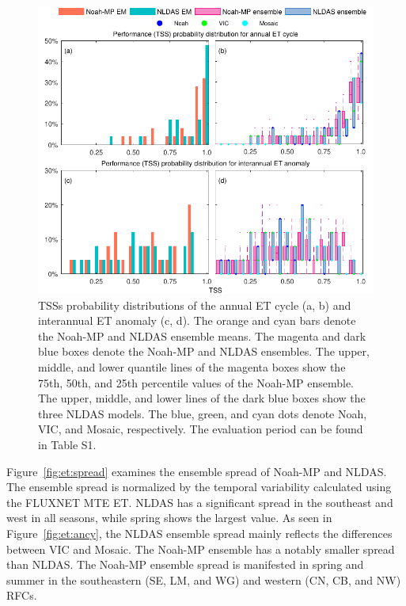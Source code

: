 \documentclass[essd, manuscript]{copernicus}
\begin{document}
\begin{figure}[t]
  \includegraphics[width=12cm]{fig/fig12.pdf}
  \caption{TSSs probability distributions of the annual ET cycle (a, b) and interannual ET anomaly (c, d). The orange and cyan bars denote the Noah-MP and NLDAS ensemble means. The magenta and dark blue boxes denote the Noah-MP and NLDAS ensembles. The upper, middle, and lower quantile lines of the magenta boxes show the 75th, 50th, and 25th percentile values of the Noah-MP ensemble. The upper, middle, and lower lines of the dark blue boxes show the three NLDAS models. The blue, green, and cyan dots denote Noah, VIC, and Mosaic, respectively. The evaluation period can be found in Table S1.}
  \label{fig:et:tss}
\end{figure}

Figure~\ref{fig:et:spread} examines the ensemble spread of Noah-MP and NLDAS. The ensemble spread is normalized by the temporal variability calculated using the FLUXNET MTE ET. NLDAS has a significant spread in the southeast and west in all seasons, while spring shows the largest value. As seen in Figure~\ref{fig:et:ancy}, the NLDAS ensemble spread mainly reflects the differences between VIC and Mosaic. The Noah-MP ensemble has a notably smaller spread than NLDAS. The Noah-MP ensemble spread is manifested in spring and summer in the southeastern (SE, LM, and WG) and western (CN, CB, and NW) RFCs.
\end{document}
